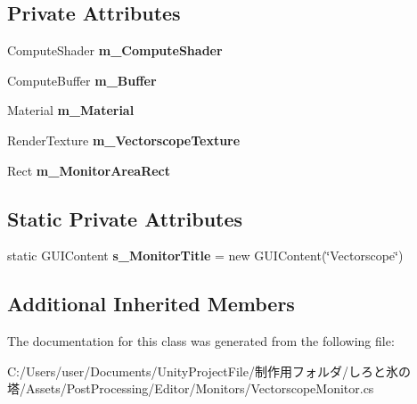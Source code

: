 \subsection*{Private Attributes}
\begin{DoxyCompactItemize}
\item 
\mbox{\label{class_unity_editor_1_1_post_processing_1_1_vectorscope_monitor_a138bf5d4c88bbfa2d2ffc213897ed4ca}} 
Compute\+Shader {\bfseries m\+\_\+\+Compute\+Shader}
\item 
\mbox{\label{class_unity_editor_1_1_post_processing_1_1_vectorscope_monitor_ae17bc0a4b07af47807162e28de3d70fb}} 
Compute\+Buffer {\bfseries m\+\_\+\+Buffer}
\item 
\mbox{\label{class_unity_editor_1_1_post_processing_1_1_vectorscope_monitor_a82752010b24170e8321725b5507e81d6}} 
Material {\bfseries m\+\_\+\+Material}
\item 
\mbox{\label{class_unity_editor_1_1_post_processing_1_1_vectorscope_monitor_a4cf435f0bd11ca99b8247716e5afc1df}} 
Render\+Texture {\bfseries m\+\_\+\+Vectorscope\+Texture}
\item 
\mbox{\label{class_unity_editor_1_1_post_processing_1_1_vectorscope_monitor_a4f6b0fc900a68c3f04fe70470df605ce}} 
Rect {\bfseries m\+\_\+\+Monitor\+Area\+Rect}
\end{DoxyCompactItemize}
\subsection*{Static Private Attributes}
\begin{DoxyCompactItemize}
\item 
\mbox{\label{class_unity_editor_1_1_post_processing_1_1_vectorscope_monitor_a1cd797a773a957de3b065a5dffb0c71b}} 
static G\+U\+I\+Content {\bfseries s\+\_\+\+Monitor\+Title} = new G\+U\+I\+Content(\char`\"{}Vectorscope\char`\"{})
\end{DoxyCompactItemize}
\subsection*{Additional Inherited Members}


The documentation for this class was generated from the following file\+:\begin{DoxyCompactItemize}
\item 
C\+:/\+Users/user/\+Documents/\+Unity\+Project\+File/制作用フォルダ/しろと氷の塔/\+Assets/\+Post\+Processing/\+Editor/\+Monitors/Vectorscope\+Monitor.\+cs\end{DoxyCompactItemize}
